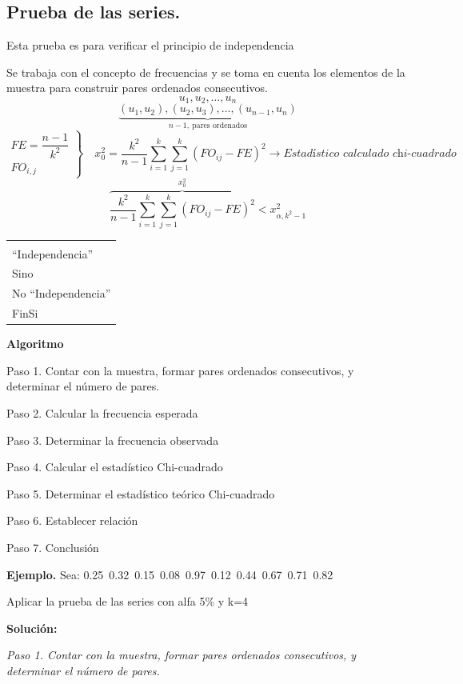\documentclass[11pt,letterpaper]{report}
\newenvironment{algoritmo}
  {\begin{center}\begin{tabular}{|p{0.85\textwidth}|}\hline\vspace{-0.2cm}\begin{tabbing}\hspace{0.6cm}\=\hspace{0.6cm}\=\hspace{0.6cm}\=\hspace{0.6cm}\=\hspace{0.6cm}\=\kill}
  {\end{tabbing}\vspace{-0.4cm}\\\hline\end{tabular}\end{center}}
\begin{document}
\subsection*{Prueba de las series.}

Esta prueba es para verificar el principio de independencia

Se trabaja con el concepto de frecuencias y se toma en cuenta los elementos de la muestra para construir pares ordenados consecutivos.
\[
u_1, u_2, \ldots, u_n
\]
\[
\underbrace{(u_1, u_2), (u_2, u_3), \ldots, (u_{n-1}, u_n)}_{n-1,\ \text{pares ordenados}}
\]
\[
\left.\begin{array}{l}
FE = \dfrac{n-1}{k^2}\\[0.3cm]
FO_{i,j}
\end{array}\right\}
\quad x_0^2 = \frac{k^2}{n-1}\sum_{i=1}^{k}\sum_{j=1}^{k}(FO_{ij} - FE)^2 \rightarrow \textit{Estadístico calculado chi-cuadrado}
\]
\[
\overbrace{\frac{k^2}{n-1}\sum_{i=1}^{k}\sum_{j=1}^{k}(FO_{ij} - FE)^2}^{x_0^2} < x_{\alpha,k^2-1}^2
\]

\begin{algoritmo}
\>Si ($x_0^2 < x_{\alpha,k^2-1}^2$)\\
\>\>``Independencia''\\
\>Sino\\
\>\>No ``Independencia''\\
\>FinSi
\end{algoritmo}

\textbf{Algoritmo}

Paso 1. Contar con la muestra, formar pares ordenados consecutivos, y determinar el número de pares.

Paso 2. Calcular la frecuencia esperada

Paso 3. Determinar la frecuencia observada

Paso 4. Calcular el estadístico Chi-cuadrado

Paso 5. Determinar el estadístico teórico Chi-cuadrado

Paso 6. Establecer relación

Paso 7. Conclusión

\textbf{Ejemplo.} Sea: 0.25\ 0.32\ 0.15\ 0.08\ 0.97\ 0.12\ 0.44\ 0.67\ 0.71\ 0.82

Aplicar la prueba de las series con alfa 5\% y k=4

\textbf{Solución:}

\textit{Paso 1. Contar con la muestra, formar pares ordenados consecutivos, y determinar el número de pares.}
\end{document}
